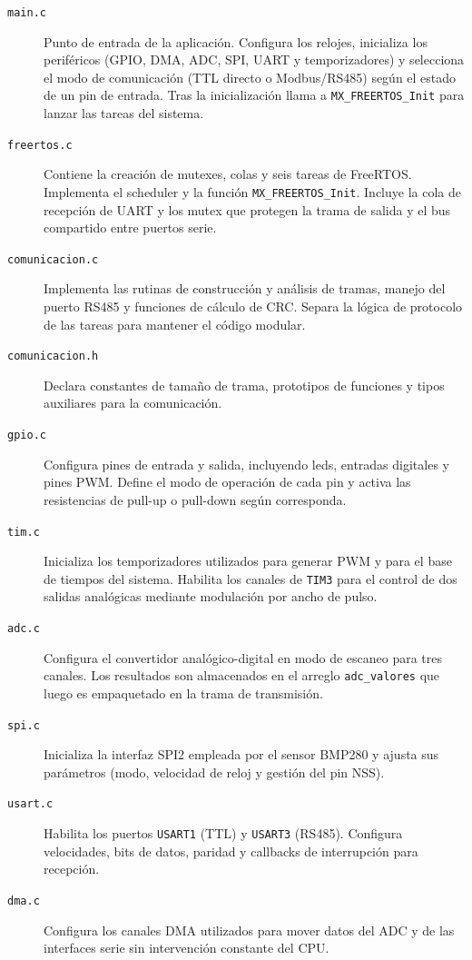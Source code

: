 \documentclass{article}
\begin{document}
\begin{description}
  \item[\texttt{main.c}] Punto de entrada de la aplicación. Configura los relojes, inicializa los periféricos (GPIO, DMA, ADC, SPI, UART y temporizadores) y selecciona el modo de comunicación (TTL directo o Modbus/RS485) según el estado de un pin de entrada. Tras la inicialización llama a \texttt{MX\_FREERTOS\_Init} para lanzar las tareas del sistema.
  \item[\texttt{freertos.c}] Contiene la creación de mutexes, colas y seis tareas de FreeRTOS. Implementa el scheduler y la función \texttt{MX\_FREERTOS\_Init}. Incluye la cola de recepción de UART y los mutex que protegen la trama de salida y el bus compartido entre puertos serie.
  \item[\texttt{comunicacion.c}] Implementa las rutinas de construcción y análisis de tramas, manejo del puerto RS485 y funciones de cálculo de CRC. Separa la lógica de protocolo de las tareas para mantener el código modular.
  \item[\texttt{comunicacion.h}] Declara constantes de tamaño de trama, prototipos de funciones y tipos auxiliares para la comunicación.
  \item[\texttt{gpio.c}] Configura pines de entrada y salida, incluyendo leds, entradas digitales y pines PWM. Define el modo de operación de cada pin y activa las resistencias de pull-up o pull-down según corresponda.
  \item[\texttt{tim.c}] Inicializa los temporizadores utilizados para generar PWM y para el base de tiempos del sistema. Habilita los canales de \texttt{TIM3} para el control de dos salidas analógicas mediante modulación por ancho de pulso.
  \item[\texttt{adc.c}] Configura el convertidor analógico-digital en modo de escaneo para tres canales. Los resultados son almacenados en el arreglo \texttt{adc\_valores} que luego es empaquetado en la trama de transmisión.
  \item[\texttt{spi.c}] Inicializa la interfaz SPI2 empleada por el sensor BMP280 y ajusta sus parámetros (modo, velocidad de reloj y gestión del pin NSS).
  \item[\texttt{usart.c}] Habilita los puertos \texttt{USART1} (TTL) y \texttt{USART3} (RS485). Configura velocidades, bits de datos, paridad y callbacks de interrupción para recepción.
  \item[\texttt{dma.c}] Configura los canales DMA utilizados para mover datos del ADC y de las interfaces serie sin intervención constante del CPU.

\end{description}
\end{document}
